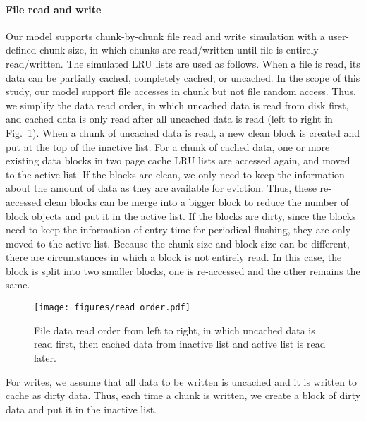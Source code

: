 \documentclass[conference]{IEEEtran}
\begin{document}
            \paragraph*{File read and write}
            Our model supports chunk-by-chunk file read and write simulation
            with a user-defined chunk size, in which chunks are read/written
            until file is entirely read/written.
            The simulated LRU lists are used as follows. 
            When a file is read, its data can be partially cached, completely cached, 
            or uncached. 
            In the scope of this study, our model support file accesses in chunk 
            but not file random access.
            Thus, we simplify the data read order, in which uncached data is read 
            from disk first, and cached data is only read after all uncached data is read 
            (left to right in Fig.~\ref{fig:read_order}).
            When a chunk of uncached data is read, a new clean block is created 
            and put at the top of the inactive list. 
            For a chunk of cached data, one or more existing data blocks in two 
            page cache LRU lists are accessed again, and moved to the active list. 
            If the blocks are clean, we only need to keep the information about the 
            amount of data as they are available for eviction. 
            Thus, these re-accessed clean blocks can be merge into a bigger block 
            to reduce the number of block objects and put it in the active list. 
            If the blocks are dirty, since the blocks need to keep the information 
            of entry time for periodical flushing, they are only moved to the active list. 
            Because the chunk size and block size can be different, there are circumstances 
            in which a block is not entirely read. 
            In this case, the block is split into two smaller blocks, one is re-accessed 
            and the other remains the same.
            
            \begin{figure}
                   \centering
                   \texttt{[image: figures/read\_order.pdf]}
                   \caption{File data read order from left to right, in which uncached data 
                   is read first, then cached data from inactive list and active list is read later.}    
                   \label{fig:read_order}
            \end{figure}    
            
            For writes, we assume that all data to be written is 
            uncached and it is written to cache as dirty data. 
            Thus, each time a chunk is written, we create a block of dirty data 
            and put it in the inactive list.        
            
\end{document}
